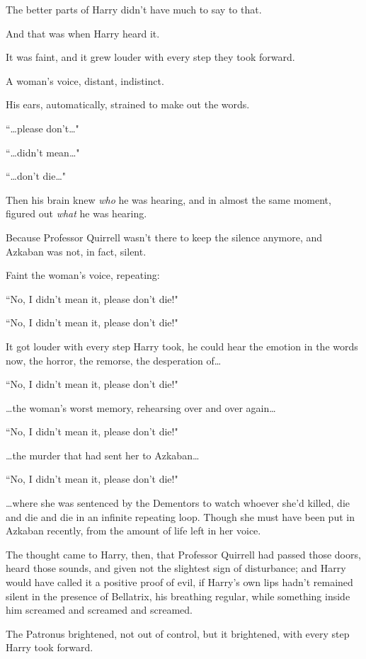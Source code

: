 The better parts of Harry didn't have much to say to that.

And that was when Harry heard it.

It was faint, and it grew louder with every step they took forward.

A woman's voice, distant, indistinct.

His ears, automatically, strained to make out the words.

``{\ldots}please don't{\ldots}"

``{\ldots}didn't mean{\ldots}"

``{\ldots}don't die{\ldots}"

Then his brain knew \emph{who} he was hearing, and in almost the same moment, figured out \emph{what} he was hearing.

Because Professor Quirrell wasn't there to keep the silence anymore, and Azkaban was not, in fact, silent.

Faint the woman's voice, repeating:

``No, I didn't mean it, please don't die!"

``No, I didn't mean it, please don't die!"

It got louder with every step Harry took, he could hear the emotion in the words now, the horror, the remorse, the desperation of{\ldots}

``No, I didn't mean it, please don't die!"

{\ldots}the woman's worst memory, rehearsing over and over again{\ldots}

``No, I didn't mean it, please don't die!"

{\ldots}the murder that had sent her to Azkaban{\ldots}

``No, I didn't mean it, please don't die!"

{\ldots}where she was sentenced by the Dementors to watch whoever she'd killed, die and die and die in an infinite repeating loop. Though she must have been put in Azkaban recently, from the amount of life left in her voice.

The thought came to Harry, then, that Professor Quirrell had passed those doors, heard those sounds, and given not the slightest sign of disturbance; and Harry would have called it a positive proof of evil, if Harry's own lips hadn't remained silent in the presence of Bellatrix, his breathing regular, while something inside him screamed and screamed and screamed.

The Patronus brightened, not out of control, but it brightened, with every step Harry took forward.

